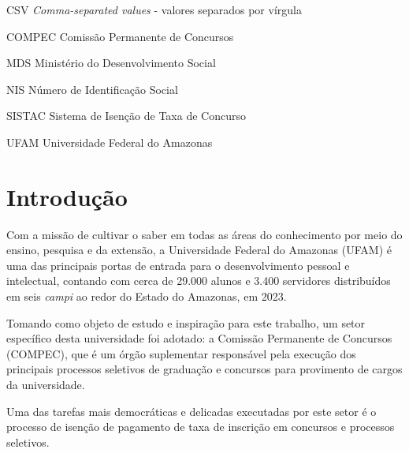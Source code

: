 \documentclass[
	12pt,			%
	openright,		%
	oneside,	
	a4paper,		%
	english,		%
	brazil			%
]{abntex2/abntex2}  %
\begin{document}
\listoffigures*
\cleardoublepage

\listoftables*
\cleardoublepage

\begin{siglas}
	\item[CSV] \textit{Comma-separated values} - valores separados por vírgula
  \item[COMPEC] Comissão Permanente de Concursos
  \item[MDS] Ministério do Desenvolvimento Social
  \item[NIS] Número de Identificação Social
  \item[SISTAC] Sistema de Isenção de Taxa de Concurso
  \item[UFAM] Universidade Federal do Amazonas
\end{siglas}


\tableofcontents*
\cleardoublepage

\textual

\chapter{Introdução}
	
	Com a missão de cultivar o saber em todas as áreas do conhecimento por meio do ensino, pesquisa e da extensão, a Universidade Federal do Amazonas (UFAM) é uma das principais
	portas de entrada para o desenvolvimento pessoal e intelectual, contando com cerca de 29.000 alunos e 3.400 servidores distribuídos em seis \textit{campi} ao redor do Estado do Amazonas, em 2023.
	
	Tomando como objeto de estudo e inspiração para este trabalho, um setor específico desta universidade foi adotado: a Comissão Permanente de Concursos (COMPEC), que é um órgão
	suplementar responsável pela execução dos principais processos seletivos de graduação e concursos para provimento de cargos da universidade.
	
	Uma das tarefas mais democráticas e delicadas executadas por este setor é o processo de isenção de pagamento de taxa de inscrição em concursos e processos seletivos.
	
\end{document}
